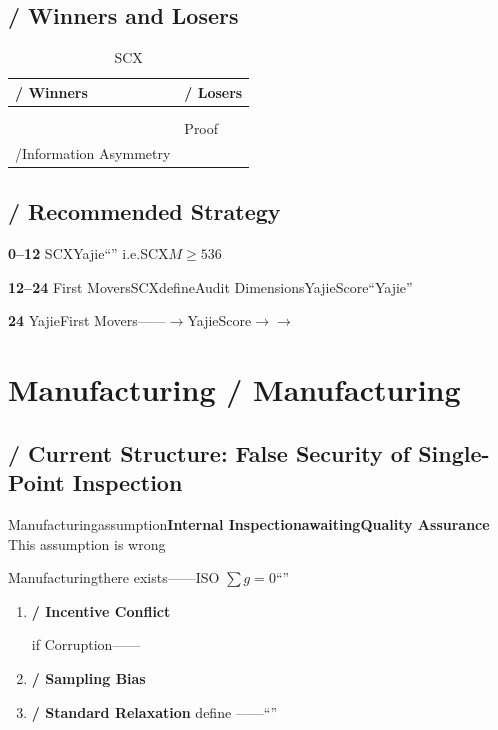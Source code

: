 \documentclass[12pt,a4paper]{article}
\theoremstyle{remark}
\newcommand{\sumgeq}{\sum g = 0}
\begin{document}
\subsection{ / Winners and Losers}

\begin{table}[H]
\centering
\caption{SCX}
\label{tab:services_wl}
\begin{tabular}{@{}p{7cm}p{7cm}@{}}
\toprule
\textbf{ / Winners} & \textbf{ / Losers} \\
\midrule
 &  \\
\addlinespace
 &  \\
\addlinespace
 & Proof \\
\addlinespace
/Information Asymmetry &  \\
\bottomrule
\end{tabular}
\end{table}

\subsection{ / Recommended Strategy}

\textbf{0--12}
SCXYajie``''
i.e.SCX$M \geq 5$36

\textbf{12--24}
First MoversSCXdefineAudit DimensionsYajieScore``Yajie''

\textbf{24}
YajieFirst Movers——$\to$YajieScore$\to$$\to$

\section{Manufacturing / Manufacturing}

\subsection{ / Current Structure: False Security of Single-Point Inspection}

Manufacturingassumption\textbf{Internal InspectionawaitingQuality Assurance}
This assumption is wrong

Manufacturingthere exists——ISO
$\sumgeq$``''

\begin{enumerate}[leftmargin=*, label=\textbf{(\arabic*)}]
    \item \textbf{ / Incentive Conflict}
    
    
    if
    Corruption——
    

    \item \textbf{ / Sampling Bias}
    
    

    \item \textbf{ / Standard Relaxation}
    define
    ——``''
    
\end{enumerate}
\end{document}

